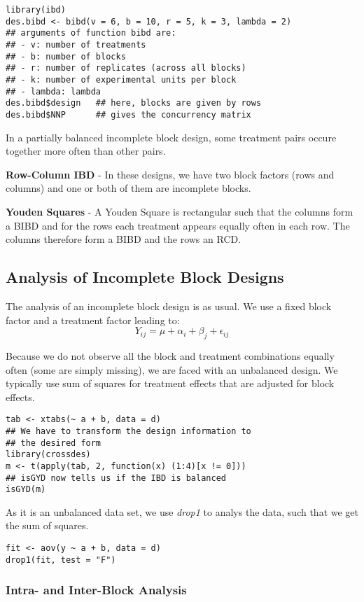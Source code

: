 \begin{lstlisting}
library(ibd)
des.bibd <- bibd(v = 6, b = 10, r = 5, k = 3, lambda = 2) 
## arguments of function bibd are:
## - v: number of treatments
## - b: number of blocks
## - r: number of replicates (across all blocks)
## - k: number of experimental units per block
## - lambda: lambda
des.bibd$design   ## here, blocks are given by rows
des.bibd$NNP      ## gives the concurrency matrix
\end{lstlisting}

In a partially balanced incomplete block design, some treatment pairs occure together more often than other pairs.\medskip

\textbf{Row-Column IBD} - In these designs, we have two block factors (rows and columns) and one or both of them are incomplete blocks. \medskip

\textbf{Youden Squares} - A Youden Square is rectangular such that the columns form a BIBD and for the rows each treatment appears equally often in each row. The columns therefore form a BIBD and the rows an RCD.


\subsection{Analysis of Incomplete Block Designs} 

The analysis of an incomplete block design is as usual. We use a fixed block factor and a treatment factor leading to:
$$Y_{ij} = \mu + \alpha_i + \beta_j + \epsilon_{ij}$$

Because we do not observe all the block and treatment combinations equally often (some are simply missing), we are faced with an unbalanced design. We typically use sum of squares for treatment effects that are adjusted for block effects.

\begin{lstlisting}
tab <- xtabs(~ a + b, data = d)
## We have to transform the design information to 
## the desired form
library(crossdes)
m <- t(apply(tab, 2, function(x) (1:4)[x != 0]))
## isGYD now tells us if the IBD is balanced
isGYD(m)
\end{lstlisting}

As it is an unbalanced data set, we use \textit{drop1} to analys the data, such that we get the sum of squares.
\begin{lstlisting}
fit <- aov(y ~ a + b, data = d)
drop1(fit, test = "F")
\end{lstlisting}


\subsubsection{Intra- and Inter-Block Analysis}


